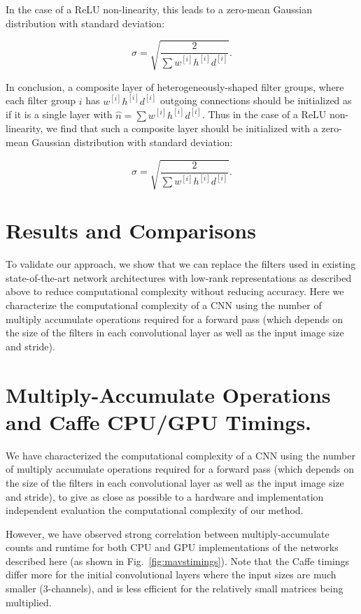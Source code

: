 \documentclass[thesis]{subfiles}
\begin{document}
    In the case of a ReLU non-linearity, this leads to a zero-mean Gaussian distribution with standard deviation:
    
    \begin{equation}
    \sigma = \sqrt{\frac{2}{\sum{ w^{[i]} h^{[i]} d^{[i]}}}}.
    \end{equation}
    
    In conclusion, a composite layer of heterogeneously-shaped filter groups, where each filter group $i$ has $w^{[i]} h^{[i]} d^{[i]}$ outgoing connections should be initialized as if it is a single layer with  $\hat{n} = \sum{ w^{[i]} h^{[i]} d^{[i]}}$. Thus in the case of a ReLU non-linearity, we find that such a composite layer should be initialized with a zero-mean Gaussian distribution with standard deviation:
    
    \begin{equation}
    \sigma = \sqrt{\frac{2}{\sum{ w^{[i]} h^{[i]} d^{[i]}}}}.
    \end{equation}
    
    \section{Results and Comparisons}
    To validate our approach, we show that we can replace the filters used in existing state-of-the-art network architectures with low-rank representations as described above to reduce computational complexity without reducing accuracy. Here we characterize the computational complexity of a CNN using the number of multiply accumulate operations required for a forward pass (which depends on the size of the filters in each convolutional layer as well as the input image size and stride). 
    \section{Multiply-Accumulate Operations and Caffe CPU/GPU Timings.}
    \label{mavstimings}
    We have characterized the computational complexity of a CNN using the number of multiply accumulate operations required for a forward pass (which depends on the size of the filters in each convolutional layer as well as the input image size and stride), to give as close as possible to a hardware and implementation independent evaluation the computational complexity of our method. 
    
    
    However, we have observed strong correlation between multiply-accumulate counts and runtime for both CPU and GPU implementations of the networks described here (as shown in Fig.~\ref{fig:mavstimings}). Note that the Caffe timings differ more for the initial convolutional layers where the input sizes are much smaller (3-channels), and  is less efficient for the relatively small matrices being multiplied.
    
\end{document}
